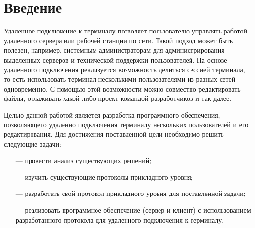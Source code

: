 \chapter*{Введение}

Удаленное подключение к терминалу позволяет пользователю управлять работой удаленного сервера или рабочей станции по сети. Такой подход может быть полезен, например, системным администраторам для администрирования выделенных серверов и технической поддержки пользователей. На основе удаленного подключения реализуется возможность делиться сессией терминала, то есть использовать терминал несколькими пользователями из разных сетей одновременно. С помощью этой возможности можно совместно редактировать файлы, отлаживать какой-либо проект командой разработчиков и так далее.

Целью данной работой является разработка программного обеспечения, позволяющего удаленно подключения терминалу нескольких пользователей и его редактирования. Для достижения поставленной цели необходимо решить следующие задачи:

\begin{itemize}
	\item[---] провести анализ существующих решений;
	\item[---] изучить существующие протоколы прикладного уровня;
	\item[---] разработать свой протокол прикладного уровня для поставленной задачи;
	\item[---] реализовать программное обеспечение (сервер и клиент) с использованием разработанного протокола для удаленного подключения к терминалу.
\end{itemize}

